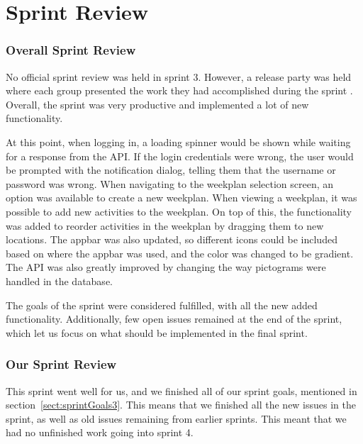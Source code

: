 \section{Sprint Review}
\subsubsection{Overall Sprint Review}
No official sprint review was held in sprint 3. However, a release party was held where each group presented the work they had accomplished during the sprint .
Overall, the sprint was very productive and implemented a lot of new functionality. 

At this point, when logging in, a loading spinner would be shown while waiting for a response from the API. If the login credentials were wrong, the user would be prompted with the notification dialog, telling them that the username or password was wrong. 
When navigating to the weekplan selection screen, an option was available to create a new weekplan. When viewing a weekplan, it was possible to add new activities to the weekplan. On top of this, the functionality was added to reorder activities in the weekplan by dragging them to new locations.
The appbar was also updated, so different icons could be included based on where the appbar was used, and the color was changed to be gradient. 
The API was also greatly improved by changing the way pictograms were handled in the database. 

The goals of the sprint were considered fulfilled, with all the new added functionality. Additionally, few open issues remained at the end of the sprint, which let us focus on what should be implemented in the final sprint.



\subsubsection{Our Sprint Review}
This sprint went well for us, and we finished all of our sprint goals, mentioned in section~\ref{sect:sprintGoals3}. This means that we finished all the new issues in the sprint, as well as old issues remaining from earlier sprints. This meant that we had no unfinished work going into sprint 4. 

